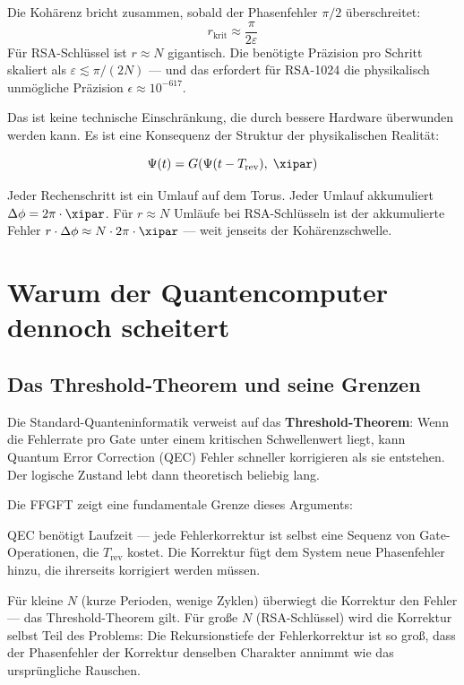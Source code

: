 Die Kohärenz bricht zusammen, sobald der Phasenfehler $\pi/2$ überschreitet:
\begin{equation}
    r_\text{krit} \approx \frac{\pi}{2\varepsilon}
\end{equation}
Für RSA-Schlüssel ist $r \approx N$ gigantisch. Die benötigte Präzision pro Schritt
skaliert als $\varepsilon \lesssim \pi/(2N)$ — und das erfordert für RSA-1024
die physikalisch unmögliche Präzision $\epsilon \approx 10^{-617}$.

\begin{foundation}
Das ist keine technische Einschränkung, die durch bessere Hardware überwunden
werden kann. Es ist eine Konsequenz der Struktur der physikalischen Realität:

\begin{equation}
    \Psi(t) = G\!\left(\Psi(t - T_\text{rev}),\; \xipar\right)
\end{equation}

Jeder Rechenschritt ist ein Umlauf auf dem Torus. Jeder Umlauf akkumuliert
$\Delta\phi = 2\pi \cdot \xipar$. Für $r \approx N$ Umläufe bei RSA-Schlüsseln
ist der akkumulierte Fehler $r \cdot \Delta\phi \approx N \cdot 2\pi \cdot \xipar$
— weit jenseits der Kohärenzschwelle.
\end{foundation}


\section{Warum der Quantencomputer dennoch scheitert}

\subsection{Das Threshold-Theorem und seine Grenzen}

Die Standard-Quanteninformatik verweist auf das \textbf{Threshold-Theorem}:
Wenn die Fehlerrate pro Gate unter einem kritischen Schwellenwert liegt, kann
Quantum Error Correction (QEC) Fehler schneller korrigieren als sie entstehen.
Der logische Zustand lebt dann theoretisch beliebig lang.

Die FFGFT zeigt eine fundamentale Grenze dieses Arguments:

\begin{important}
QEC benötigt Laufzeit — jede Fehlerkorrektur ist selbst eine Sequenz von
Gate-Operationen, die $T_\text{rev}$ kostet. Die Korrektur fügt dem System
neue Phasenfehler hinzu, die ihrerseits korrigiert werden müssen.

Für kleine $N$ (kurze Perioden, wenige Zyklen) überwiegt die Korrektur den
Fehler — das Threshold-Theorem gilt. Für große $N$ (RSA-Schlüssel) wird die
Korrektur selbst Teil des Problems: Die Rekursionstiefe der Fehlerkorrektur
ist so groß, dass der Phasenfehler der Korrektur denselben Charakter annimmt
wie das ursprüngliche Rauschen.
\end{important}

